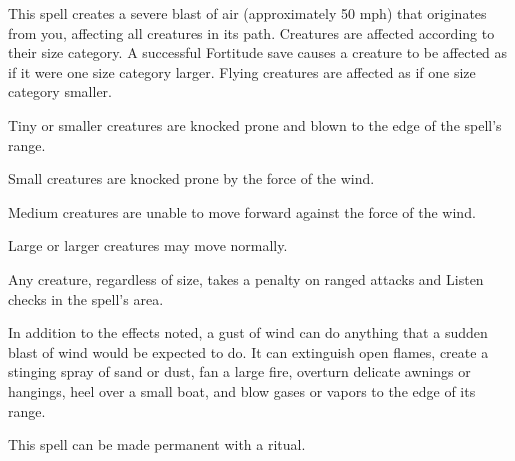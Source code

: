 \begin{spelleffect}
  This spell creates a severe blast of air (approximately 50 mph) that originates from you, affecting all creatures in its path. Creatures are affected according to their size category. A successful Fortitude save causes a creature to be affected as if it were one size category larger. Flying creatures are affected as if one size category smaller.
  \begin{itemize*}
    \item Tiny or smaller creatures are knocked prone and blown to the edge of the spell's range.
    \item Small creatures are knocked prone by the force of the wind.
    \item Medium creatures are unable to move forward against the force of the wind.
    \item Large or larger creatures may move normally.
  \end{itemize*}
  \par Any creature, regardless of size, takes a  penalty on ranged attacks and Listen checks in the spell's area.
  \par In addition to the effects noted, a gust of wind can do anything that a sudden blast of wind would be expected to do. It can extinguish open flames, create a stinging spray of sand or dust, fan a large fire, overturn delicate awnings or hangings, heel over a small boat, and blow gases or vapors to the edge of its range.
\end{spelleffect}
\begin{spellnotes}
This spell can be made permanent with a  ritual.
\end{spellnotes}

\begin{comment}
\subsubsection{H}
\end{comment}

